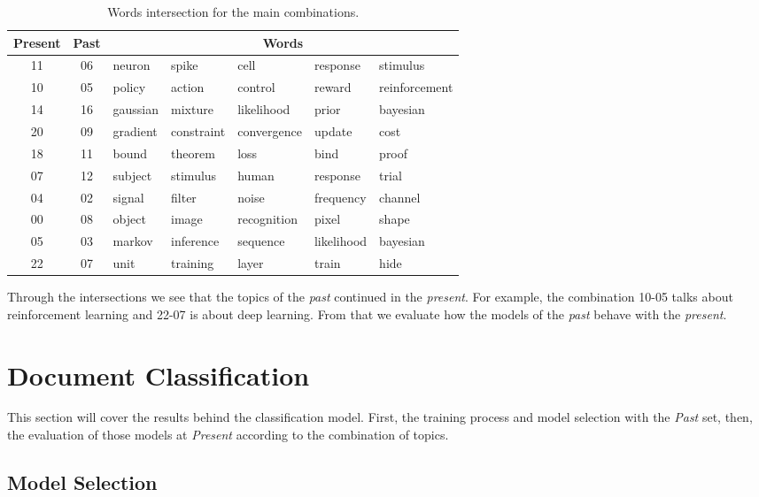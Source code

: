 \begin{table}[h!]
	\centering
	\caption{Words intersection for the main combinations.}
	\label{tab:correspondence-words}
	\begin{tabular}{cc|lllll}
		\toprule
		\textbf{Present} & \textbf{Past} & \multicolumn{5}{c}{\textbf{Words}} \\ \midrule
		11 & 06 & neuron   & spike      & cell        & response   & stimulus      \\
		10 & 05 & policy   & action     & control     & reward     & reinforcement \\
		14 & 16 & gaussian & mixture    & likelihood  & prior      & bayesian      \\
		20 & 09 & gradient & constraint & convergence & update     & cost          \\
		18 & 11 & bound    & theorem    & loss        & bind       & proof         \\
		07 & 12 & subject  & stimulus   & human       & response   & trial         \\
		04 & 02 & signal   & filter     & noise       & frequency  & channel       \\
		00 & 08 & object   & image      & recognition & pixel      & shape         \\
		05 & 03 & markov   & inference  & sequence    & likelihood & bayesian      \\
		22 & 07 & unit     & training   & layer       & train      & hide          \\ \bottomrule
	\end{tabular}
\end{table}

Through the intersections we see that the topics of the \textit{past} continued in the \textit{present}. For example, the combination 10-05 talks about reinforcement learning and 22-07 is about deep learning. From that we evaluate how the models of the \textit{past} behave with the \textit{present}.

\section{Document Classification}

This section will cover the results behind the classification model. First, the training process and model selection with the \textit{Past} set, then, the evaluation of those models at \textit{Present} according to the combination of topics.

\subsection{Model Selection}

